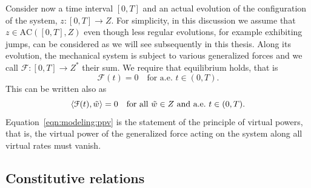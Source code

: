 \documentclass[a4paper,10pt,oneside]{amsbook}
\numberwithin{section}{chapter}
\numberwithin{equation}{chapter}
\theoremstyle{definition}
\DeclarePairedDelimiter{\dual}{\langle}{\rangle}
\begin{document}
Consider now a time interval $[0,T]$ and an actual evolution of the configuration of the system, $z\colon[0,T]\to Z$. For simplicity, in this discussion we assume that $z\in\text{AC}([0,T],Z)$ even though less regular evolutions, for example exhibiting jumps, can be considered as we will see subsequently in this thesis. Along its evolution, the mechanical system is subject to various generalized forces and we call $\mathcal{F}\colon[0,T]\to Z^*$ their sum. We require that equilibrium holds, that is
\[
\mathcal{F}(t)=0\quad\text{for a.e.\ $t\in(0,T)$}.
\]
This can be written also as
\begin{equation}
\label{eqn:modeling:ppv}
\dual{\mathcal{F}(t),\tilde{w}}=0\quad\text{for all $\tilde w\in Z$ and a.e.\ $t\in(0,T)$}.
\end{equation}
Equation~\eqref{eqn:modeling:ppv} is the statement of the principle of virtual powers, that is, the virtual power of the generalized force acting on the system along all virtual rates must vanish.

\subsection{Constitutive relations}
\end{document}
